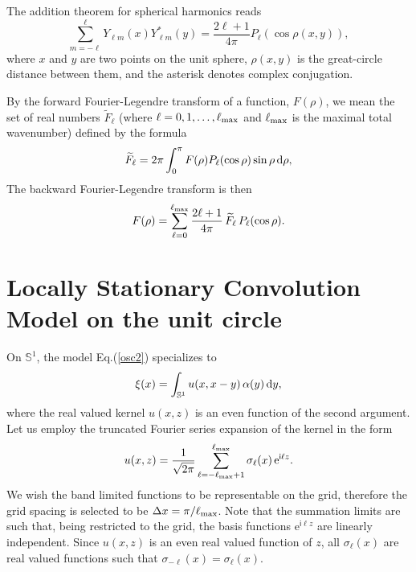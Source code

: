 \documentclass[12pt]{article}
\renewcommand{\S}{{\mathbb S}}
\renewcommand{\d}{{\rm d}}
\newcommand{\e}{\mathrm{e}}
\renewcommand{\i}{\mathsf{i}}
\begin{document}
The addition theorem for spherical harmonics reads
%
\begin {equation}
\label{addThm}
\sum_{m=-\ell}^\ell Y_{\ell m}(x) Y_{\ell m}^*(y) = \frac{2\ell +1}{4\pi} P_\ell(\cos \rho(x,y)),
\end {equation}
%
where $x$ and $y$ are two points on the unit sphere,
$\rho(x,y)$ is the great-circle distance between them, and
the asterisk denotes complex conjugation.

By the forward Fourier-Legendre transform of a function, $F(\rho)$, we mean the set of real numbers
$\widetilde F_\ell$ (where $\ell=0,1,\dots, \ell_{\rm max}$ and $\ell_{\rm max}$ is the maximal total wavenumber)
defined by the formula
%
\begin {equation}
\label{FLfwd}
\widetilde F_\ell = 2\pi \int_0^\pi F(\rho) P_\ell(\cos\rho) \sin\rho \,\d\rho,
\end {equation}
%
The backward Fourier-Legendre transform   is then
%
\begin {equation}
\label{FLbck}
F(\rho) =  \sum^{\ell_{\rm max}}_{\ell=0} \frac{2\ell +1}{4\pi} \,\widetilde F_\ell \, P_\ell(\cos\rho).
\end {equation}
%



\section{Locally Stationary Convolution Model on the unit circle}
\label{App_LSM_S1}




On $\S^1$, the model Eq.(\ref{osc2}) specializes to 
%
\begin {equation}
\label{xiu_S1}
\xi(x) = \int_{\S^1} u(x, x-y) \,\alpha(y) \,\d y,
\end {equation}
%
where the real valued kernel $u(x, z)$ is an even function of the second argument.
Let us employ the truncated Fourier series expansion of the kernel 
in the form
%
\begin {equation}
\label{u_spe_S1}
u(x, z) =  \frac{1}{\sqrt{2\pi}}   \sum_{\ell=-\ell_{\rm max}+1}^{\ell_{\rm max}}  \sigma_\ell(x) \, \e^{\i \ell z}.
\end {equation}
%
We wish the band limited functions to be representable on the grid, therefore the grid spacing is selected to be
$\Delta x = \pi / \ell_{\rm max}$.
Note that the  summation limits are such that, being restricted to the grid, the basis functions
$\e^{\i \ell z}$   are linearly independent.
Since $u(x, z)$ is an even real valued function of $z$, all $\sigma_\ell(x)$ are real 
valued functions such that $\sigma_{-\ell}(x)=\sigma_\ell(x)$.
\end{document}
